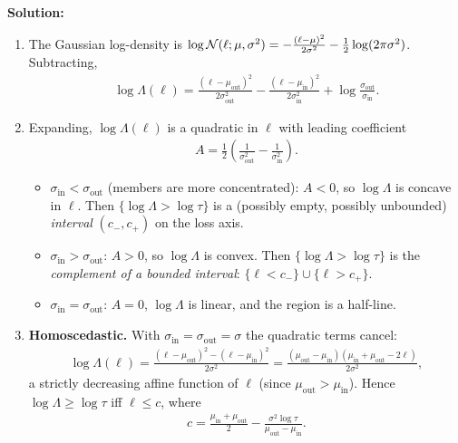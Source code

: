 \documentclass[12pt]{article}
\begin{document}
\begin{enumerate}
\begin{solution}
{\bf Solution:}\\
\begin{enumerate}
    \item The Gaussian log-density is $\log{\cal N}(\ell; \mu, \sigma^2) = -\frac{(\ell - \mu)^2}{2\sigma^2} - \frac{1}{2}\log(2\pi\sigma^2)$. Subtracting,
    \begin{align*}
        \log\Lambda(\ell) = \frac{(\ell - \mu_{\mathrm{out}})^2}{2\sigma_{\mathrm{out}}^2} - \frac{(\ell - \mu_{\mathrm{in}})^2}{2\sigma_{\mathrm{in}}^2} + \log\frac{\sigma_{\mathrm{out}}}{\sigma_{\mathrm{in}}}.
    \end{align*}

    \item Expanding, $\log\Lambda(\ell)$ is a quadratic in $\ell$ with leading coefficient
    \begin{align*}
        A = \frac{1}{2}\left(\frac{1}{\sigma_{\mathrm{out}}^2} - \frac{1}{\sigma_{\mathrm{in}}^2}\right).
    \end{align*}
    \begin{itemize}
        \item $\sigma_{\mathrm{in}} < \sigma_{\mathrm{out}}$ (members are more concentrated): $A < 0$, so $\log\Lambda$ is concave in $\ell$. Then $\{\log\Lambda > \log\tau\}$ is a (possibly empty, possibly unbounded) \emph{interval} $(c_-, c_+)$ on the loss axis.
        \item $\sigma_{\mathrm{in}} > \sigma_{\mathrm{out}}$: $A > 0$, so $\log\Lambda$ is convex. Then $\{\log\Lambda > \log\tau\}$ is the \emph{complement of a bounded interval}: $\{\ell < c_-\} \cup \{\ell > c_+\}$.
        \item $\sigma_{\mathrm{in}} = \sigma_{\mathrm{out}}$: $A = 0$, $\log\Lambda$ is linear, and the region is a half-line.
    \end{itemize}

    \item \textbf{Homoscedastic.} With $\sigma_{\mathrm{in}} = \sigma_{\mathrm{out}} = \sigma$ the quadratic terms cancel:
    \begin{align*}
        \log\Lambda(\ell) = \frac{(\ell - \mu_{\mathrm{out}})^2 - (\ell - \mu_{\mathrm{in}})^2}{2\sigma^2} = \frac{(\mu_{\mathrm{out}} - \mu_{\mathrm{in}})(\mu_{\mathrm{in}} + \mu_{\mathrm{out}} - 2\ell)}{2\sigma^2},
    \end{align*}
    a strictly decreasing affine function of $\ell$ (since $\mu_{\mathrm{out}} > \mu_{\mathrm{in}}$). Hence $\log\Lambda \ge \log\tau$ iff $\ell \le c$, where
    \begin{align*}
        c = \frac{\mu_{\mathrm{in}} + \mu_{\mathrm{out}}}{2} - \frac{\sigma^2 \log\tau}{\mu_{\mathrm{out}} - \mu_{\mathrm{in}}}.
    \end{align*}


\end{enumerate}
\end{solution}
\end{enumerate}
\end{document}
